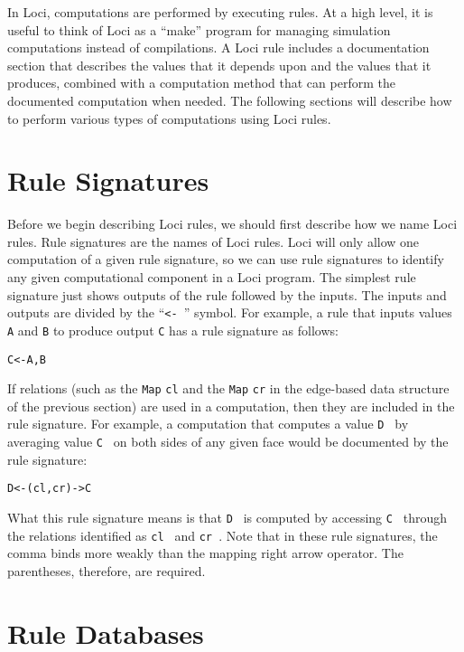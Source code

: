 \documentclass[10pt,epsf]{book}
\begin{document}
In Loci, computations are performed by executing rules.  At a high
level, it is useful to think of Loci as a ``make'' program for
managing simulation computations instead of compilations.  A Loci rule
includes a documentation section that describes the values that it
depends upon and the values that it produces, combined with a
computation method that can perform the documented computation when
needed.  The following sections will describe how to perform various
types of computations using Loci rules.

\section{Rule Signatures}

Before we begin describing Loci rules, we should first describe how we
name Loci rules.  Rule signatures are the names of Loci rules.  Loci
will only allow one computation of a given rule signature, so we can
use rule signatures to identify any given computational component in a
Loci program.  The simplest rule signature just shows outputs of the
rule followed by the inputs.  The inputs and outputs are divided by
the ``{\tt <- }'' symbol.  For example, a rule that inputs values {\tt
  A} and {\tt B} to produce output {\tt C} has a rule signature as
follows:

\begin{verbatim}
C<-A,B
\end{verbatim}

If relations (such as the {\tt Map} {\tt cl}
and the {\tt Map} {\tt cr} in the edge-based data structure of the
previous section) are used in a computation, then they are included 
in the rule signature.
For example, a computation that computes a value {\tt D }
by averaging value {\tt C } on both sides of any given face would
be documented by the rule signature:

\begin{verbatim}
D<-(cl,cr)->C
\end{verbatim}

What this rule signature means is that {\tt D } is computed by
accessing {\tt C } through the relations identified as 
{\tt cl } and {\tt cr }.  Note that in these rule signatures, 
the comma binds more weakly than
the mapping right arrow operator.  The
parentheses, therefore, are required.

\section{Rule Databases}
\end{document}
